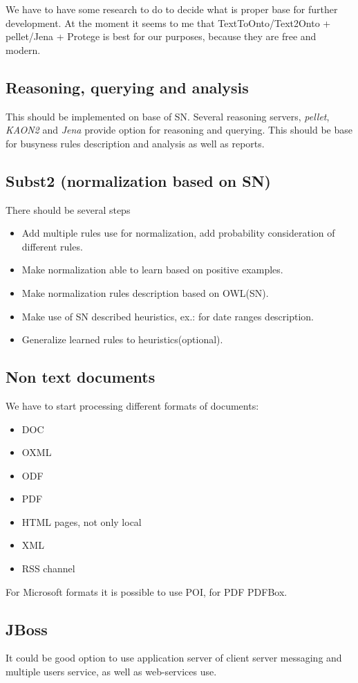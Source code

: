 \documentclass[12pt]{article}
\begin{document}
We have to have some research to do to decide what is proper base for further development. At the moment it seems to me that TextToOnto/Text2Onto + pellet/Jena + Protege is best for our purposes, because they are free and modern.

\subsection{Reasoning, querying and analysis}
This should be implemented on base of SN. Several reasoning servers, \emph{pellet}, \emph{KAON2} and \emph{Jena} provide option for reasoning and querying. This should be base for busyness rules description and analysis as well as reports.

\subsection{Subst2 (normalization based on SN)}
There should be several steps
\begin{itemize}
  \item Add multiple rules use for normalization, add probability consideration of different rules.
  \item Make normalization able to learn based on positive examples.
  \item Make normalization rules description based on OWL(SN).
  \item Make use of SN described heuristics, ex.: for date ranges description.
  \item Generalize learned rules to heuristics(optional).
\end{itemize}

\subsection{Non text documents}
We have to start processing different formats of documents:
\begin{itemize}
  \item DOC
  \item OXML
  \item ODF
  \item PDF
  \item HTML pages, not only local
  \item XML
  \item RSS channel
\end{itemize}
For Microsoft formats it is possible to use POI, for PDF PDFBox.

\subsection{JBoss}
It could be good option to use application server of client server messaging and multiple users service, as well as web-services use.
\end{document}

